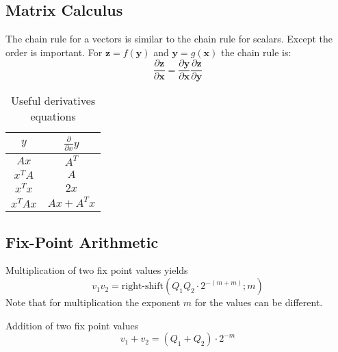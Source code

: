\subsection{Matrix Calculus}

The chain rule for a vectors is similar to the chain rule for scalars. Except the order is important. For $\mathbf{z} = f(\mathbf{y})$ and $\mathbf{y} = g(\mathbf{x}) $ the chain rule is:
\begin{equation}
    \frac{\partial \mathbf{z}}{\partial \mathbf{x}} = \frac{\partial \mathbf{y}}{\partial \mathbf{x}}     \frac{\partial \mathbf{z}}{\partial \mathbf{y}}
\end{equation}




\begin{table}[h]
    \centering
    \begin{tabular}{cc}
        \toprule
            $y$ & $\frac{\partial}{\partial x} y$ \\
        \midrule
            $Ax$     & $A^T$ \\
            $x^T A$  & $A$   \\
            $x^T x$  & $2x$  \\  
            $x^T Ax$ & $Ax + A^Tx$  \\          
        \bottomrule
    \end{tabular}
    \caption{Useful derivatives equations}
\end{table}


\subsection{Fix-Point Arithmetic}

Multiplication of two fix point values yields 
\begin{equation}
	v_1 v_2 = \text{right-shift}\left( Q_1 Q_2 \cdot 2^{-(m+m)} ; m\right)
\end{equation}
Note that for multiplication the exponent $m$ for the values can be different.

Addition of two fix point values
\begin{equation}
	v_1 + v_2 = \left( Q_1 + Q_2 \right) \cdot 2^{-m}
\end{equation}